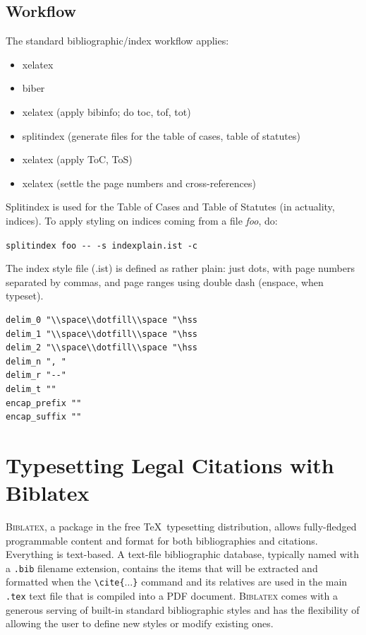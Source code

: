 \subsection{Workflow}
The standard bibliographic/index workflow applies:
\begin{itemize}
\item xelatex
\item biber
\item xelatex (apply bibinfo; do toc, tof, tot)
\item splitindex (generate files for the table of cases, table of statutes)
\item  xelatex (apply ToC, ToS)
\item xelatex (settle the page numbers and cross-references)
\end{itemize}

Splitindex is used for the Table of Cases and Table of Statutes (in actuality, indices). To apply styling on indices coming from a file \textit{foo}, do: 

\verb|splitindex foo -- -s indexplain.ist -c|
\bigskip

The index style file (.ist) is defined as rather plain: just dots, with page numbers separated by commas, and page ranges using double dash (enspace, when typeset).

\begin{verbatim}
delim_0 "\\space\\dotfill\\space "\hss
delim_1 "\\space\\dotfill\\space "\hss
delim_2 "\\space\\dotfill\\space "\hss
delim_n ", "
delim_r "--"
delim_t ""
encap_prefix ""
encap_suffix ""
\end{verbatim}


\section{Typesetting Legal Citations with Biblatex}
\textsc{Biblatex}, a package in the free \TeX\ typesetting distribution, allows fully-fledged programmable content and format for both bibliographies and citations. 
Everything is text-based. 
A text-file bibliographic database, typically named with a \texttt{.bib} filename extension, contains the items that will be extracted and formatted when the  \texttt{\textbackslash cite\{$\ldots$\}} command and its relatives are used in the main \texttt{.tex} text file that is compiled into a PDF document. \textsc{Biblatex} comes with a generous serving of built-in standard bibliographic styles and has the flexibility of allowing the user to define new styles or modify existing ones.

